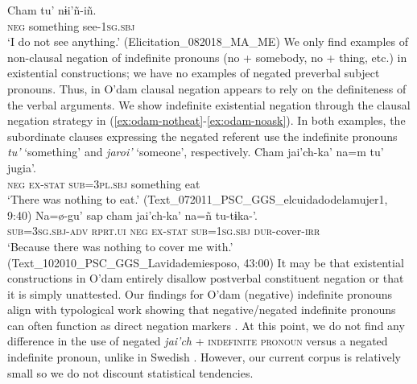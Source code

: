 \documentclass[output=paper,draft,draftmode,colorlinks,citecolor=brown]{langscibook}
\begin{document}
\z 
\ea
\label{ex:odam-seeanything}
\gll Cham 	tu’ 		nɨi’ñ-iñ.\\
\textsc{neg}	something	see-1\textsc{sg.sbj}\\
\glt ‘I do not see anything.’ (Elicitation\_082018\_MA\_ME)
\z 
We only find examples of non-clausal negation of indefinite pronouns (no + somebody, no + thing, etc.) in existential constructions; we have no examples of negated preverbal subject pronouns. Thus, in O'dam clausal negation appears to rely on the definiteness of the verbal arguments. We show indefinite existential negation through the clausal negation strategy in (\ref{ex:odam-notheat}-\ref{ex:odam-noask}). In both examples, the subordinate clauses expressing the negated referent use the indefinite pronouns \emph{tu’} ‘something’ and \emph{jaroi’} ‘someone’, respectively.
\ea
\label{ex:odam-notheat}
\gll Cham 	jai’ch-ka’ 	na=m 			tu’ 		jugia’.\\
\textsc{neg} 	\textsc{ex-stat} 	\textsc{sub=3pl.sbj} 	something 	eat\\
\glt ‘There was nothing to eat.’ (Text\_072011\_PSC\_GGS\_elcuidadodelamujer1, 9:40)
\z 
\ea
\label{ex:odam-noask}
\gll Na=\o-gu' sap cham jai'ch-ka' na=ñ tu-tɨka-'.\\
\textsc{sub=3sg.sbj-adv} \textsc{rprt.ui} \textsc{neg} \textsc{ex-stat} \textsc{sub=1sg.sbj} \textsc{dur-}cover-\textsc{irr}\\
\glt ‘Because there was nothing to cover me with.’ (Text\_102010\_PSC\_GGS\_Lavidademiesposo, 43:00)
\z 
It may be that existential constructions in O’dam entirely disallow postverbal constituent negation or that it is simply unattested. Our findings for O'dam (negative) indefinite pronouns align with typological work showing that negative/ne\-gated indefinite pronouns can often function as direct negation markers \citep{Haspelmath1997,Veselinova2013,Alsenoy2016}. At this point, we do not find any difference in the use of negated \emph{jai'ch} + \textsc{indefinite pronoun} versus a negated indefinite pronoun, unlike in Swedish \citep{Bordal2017}. However, our current corpus is relatively small so we do not discount statistical tendencies.
\end{document}
